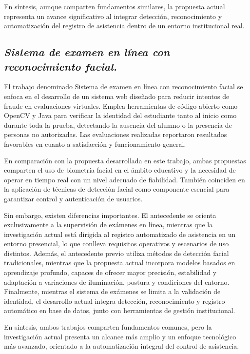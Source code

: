 En síntesis, aunque comparten fundamentos similares, la propuesta actual representa un avance significativo al integrar detección, reconocimiento y automatización del registro de asistencia dentro de un entorno institucional real.

\subsection*{\textit{Sistema de examen en línea con reconocimiento facial.}}

El trabajo denominado Sistema de examen en línea con reconocimiento facial se enfoca en el desarrollo de un sistema web diseñado para reducir intentos de fraude en evaluaciones virtuales. Emplea herramientas de código abierto como OpenCV y Java para verificar la identidad del estudiante tanto al inicio como durante toda la prueba, detectando la ausencia del alumno o la presencia de personas no autorizadas. Las evaluaciones realizadas reportaron resultados favorables en cuanto a satisfacción y funcionamiento general\cite{examOnline}.

En comparación con la propuesta desarrollada en este trabajo, ambas propuestas comparten el uso de biometría facial en el ámbito educativo y la necesidad de operar en tiempo real con un nivel adecuado de fiabilidad. También coinciden en la aplicación de técnicas de detección facial como componente esencial para garantizar control y autenticación de usuarios.

Sin embargo, existen diferencias importantes. El antecedente se orienta exclusivamente a la supervisión de exámenes en línea, mientras que la investigación actual está dirigida al registro automatizado de asistencia en un entorno presencial, lo que conlleva requisitos operativos y escenarios de uso distintos. Además, el antecedente previo utiliza métodos de detección facial tradicionales, mientras que la propuesta actual incorpora modelos basados en aprendizaje profundo, capaces de ofrecer mayor precisión, estabilidad y adaptación a variaciones de iluminación, postura y condiciones del entorno. Finalmente, mientras el sistema de exámenes se limita a la validación de identidad, el desarrollo actual integra detección, reconocimiento y registro automático en base de datos, junto con herramientas de gestión institucional.

En síntesis, ambos trabajos comparten fundamentos comunes, pero la investigación actual presenta un alcance más amplio y un enfoque tecnológico más avanzado, orientado a la automatización integral del control de asistencia.

